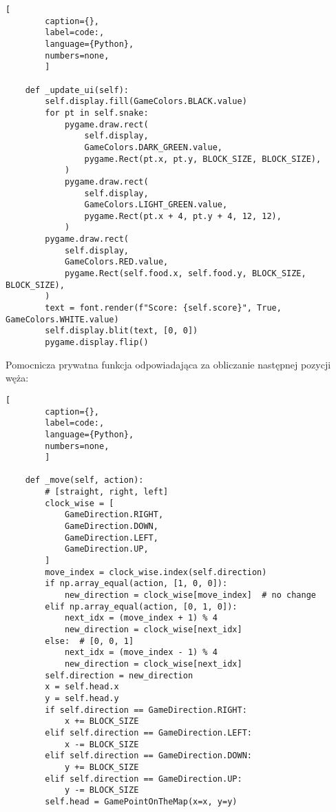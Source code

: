 \begin{onepage}
    \begin{lstlisting}[
        caption={},
        label=code:,
        language={Python},
        numbers=none,
        ]

    def _update_ui(self):
        self.display.fill(GameColors.BLACK.value)
        for pt in self.snake:
            pygame.draw.rect(
                self.display,
                GameColors.DARK_GREEN.value,
                pygame.Rect(pt.x, pt.y, BLOCK_SIZE, BLOCK_SIZE),
            )
            pygame.draw.rect(
                self.display,
                GameColors.LIGHT_GREEN.value,
                pygame.Rect(pt.x + 4, pt.y + 4, 12, 12),
            )
        pygame.draw.rect(
            self.display,
            GameColors.RED.value,
            pygame.Rect(self.food.x, self.food.y, BLOCK_SIZE, BLOCK_SIZE),
        )
        text = font.render(f"Score: {self.score}", True, GameColors.WHITE.value)
        self.display.blit(text, [0, 0])
        pygame.display.flip()
    \end{lstlisting}
\end{onepage}

\clearpage

Pomocnicza prywatna funkcja odpowiadająca za obliczanie następnej pozycji węża:

\begin{onepage}
    \begin{lstlisting}[
        caption={},
        label=code:,
        language={Python},
        numbers=none,
        ]

    def _move(self, action):
        # [straight, right, left]
        clock_wise = [
            GameDirection.RIGHT,
            GameDirection.DOWN,
            GameDirection.LEFT,
            GameDirection.UP,
        ]
        move_index = clock_wise.index(self.direction)
        if np.array_equal(action, [1, 0, 0]):
            new_direction = clock_wise[move_index]  # no change
        elif np.array_equal(action, [0, 1, 0]):
            next_idx = (move_index + 1) % 4
            new_direction = clock_wise[next_idx]
        else:  # [0, 0, 1]
            next_idx = (move_index - 1) % 4
            new_direction = clock_wise[next_idx]
        self.direction = new_direction
        x = self.head.x
        y = self.head.y
        if self.direction == GameDirection.RIGHT:
            x += BLOCK_SIZE
        elif self.direction == GameDirection.LEFT:
            x -= BLOCK_SIZE
        elif self.direction == GameDirection.DOWN:
            y += BLOCK_SIZE
        elif self.direction == GameDirection.UP:
            y -= BLOCK_SIZE
        self.head = GamePointOnTheMap(x=x, y=y)
    \end{lstlisting}
\end{onepage}



